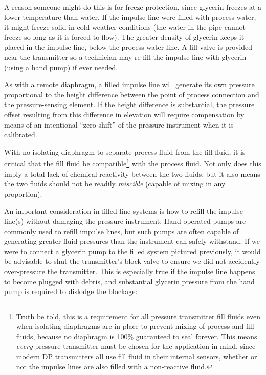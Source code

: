 A reason someone might do this is for freeze protection, since glycerin freezes at a lower temperature than water.  If the impulse line were filled with process water, it might freeze solid in cold weather conditions (the water in the pipe cannot freeze so long as it is forced to flow).  The greater density of glycerin keeps it placed in the impulse line, below the process water line.  A fill valve is provided near the transmitter so a technician may re-fill the impulse line with glycerin (using a hand pump) if ever needed.

As with a remote diaphragm, a filled impulse line will generate its own pressure proportional to the height difference between the point of process connection and the pressure-sensing element.  If the height difference is substantial, the pressure offset resulting from this difference in elevation will require compensation by means of an intentional ``zero shift'' of the pressure instrument when it is calibrated.

With no isolating diaphragm to separate process fluid from the fill fluid, it is critical that the fill fluid be compatible\footnote{Truth be told, this is a requirement for all pressure transmitter fill fluids even when isolating diaphragms are in place to prevent mixing of process and fill fluids, because no diaphragm is 100\% guaranteed to seal forever.  This means \textit{every} pressure transmitter must be chosen for the application in mind, since modern DP transmitters all use fill fluid in their internal sensors, whether or not the impulse lines are also filled with a non-reactive fluid.} with the process fluid.  Not only does this imply a total lack of chemical reactivity between the two fluids, but it also means the two fluids should not be readily \textit{miscible} (capable of mixing in any proportion).

\vskip 10pt

\filbreak

An important consideration in filled-line systems is how to refill the impulse line(s) without damaging the pressure instrument.  Hand-operated pumps are commonly used to refill impulse lines, but such pumps are often capable of generating greater fluid pressures than the instrument can safely withstand.  If we were to connect a glycerin pump to the filled system pictured previously, it would be advisable to shut the transmitter's block valve to ensure we did not accidently over-pressure the transmitter.  This is especially true if the impulse line happens to become plugged with debris, and substantial glycerin pressure from the hand pump is required to dislodge the blockage:

